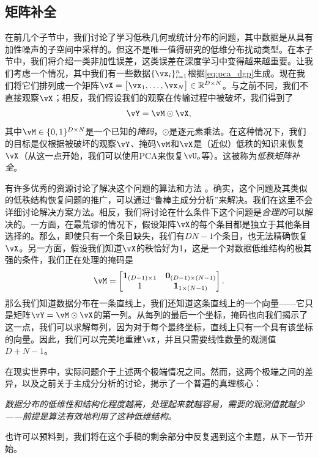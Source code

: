 \documentclass[../../book-main.tex]{subfiles}
\begin{document}
\subsection{矩阵补全}

在前几个子节中，我们讨论了学习低秩几何或统计分布的问题，其中数据是从具有加性噪声的子空间中采样的。但这不是唯一值得研究的低维分布扰动类型。在本子节中，我们将介绍一类非加性误差，这类误差在深度学习中变得越来越重要。让我们考虑一个情况，其中我们有一些数据\(\{\vx_{i}\}_{i = 1}^{n}\)根据\eqref{eq:pca_dgp}生成。现在我们将它们排列成一个矩阵\(\vX = \mat{\vx_{1}, \dots, \vx_{N}} \in \R^{D \times N}\)。与之前不同，我们不直接观察\(\vX\)；相反，我们假设我们的观察在传输过程中被破坏，我们得到了
\begin{equation}
    \vY = \vM \odot \vX,
\end{equation}
其中\(\vM \in \{0, 1\}^{D \times N}\)是一个已知的\textit{掩码}，\(\odot\)是逐元素乘法。在这种情况下，我们的目标是仅根据被破坏的观察\(\vY\)、掩码\(\vM\)和\(\vX\)是（近似）低秩的知识来恢复\(\vX\)（从这一点开始，我们可以使用PCA来恢复\(\vU_{o}\)等）。这被称为\textit{低秩矩阵补全}。

有许多优秀的资源讨论了解决这个问题的算法和方法 \cite{Wright-Ma-2022}。确实，这个问题及其类似的低秩结构恢复问题的推广，可以通过“鲁棒主成分分析”来解决。我们在这里不会详细讨论解决方案方法。相反，我们将讨论在什么条件下这个问题是\textit{合理的}可以解决的。一方面，在最荒谬的情况下，假设矩阵\(\vX\)的每个条目都是独立于其他条目选择的。那么，即使只有一个条目缺失，我们有\(DN - 1\)个条目，也无法精确恢复\(\vX\)。另一方面，假设我们知道\(\vX\)的秩恰好为1，这是一个对数据低维结构的极其强的条件，我们正在处理的掩码是
\begin{equation}
    \vM = \mat{\vone_{(D - 1) \times 1} & \vzero_{(D - 1) \times (N - 1)} \\ 1 & \vone_{1 \times (N - 1)} }.
\end{equation}
那么我们知道数据分布在一条直线上，我们还知道这条直线上的一个向量——它只是矩阵\(\vY = \vM \odot \vX\)的第一列。从每列的最后一个坐标，掩码也向我们揭示了这一点，我们可以求解每列，因为对于每个最终坐标，直线上只有一个具有该坐标的向量。因此，我们可以完美地重建\(\vX\)，并且只需要线性数量的观测值\(D + N - 1\)。

在现实世界中，实际问题介于上述两个极端情况之间。然而，这两个极端之间的差异，以及之前关于主成分分析的讨论，揭示了一个普遍的真理核心：
\begin{tcolorbox}
    \textit{数据分布的低维性和结构化程度越高，处理起来就越容易，需要的观测值就越少——前提是算法有效地利用了这种低维结构。}
\end{tcolorbox}
也许可以预料到，我们将在这个手稿的剩余部分中反复遇到这个主题，从下一节开始。
\end{document}
